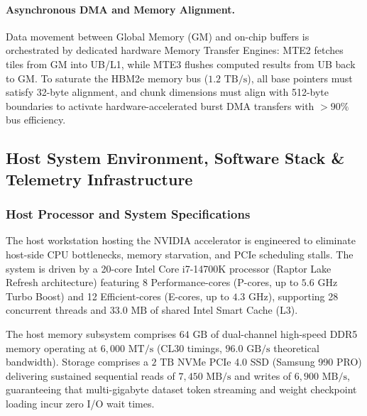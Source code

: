 \paragraph{Asynchronous DMA and Memory Alignment.} Data movement between Global Memory (GM) and on-chip buffers is orchestrated by dedicated hardware Memory Transfer Engines: MTE2 fetches tiles from GM into UB/L1, while MTE3 flushes computed results from UB back to GM. To saturate the HBM2e memory bus ($1.2\text{ TB/s}$), all base pointers must satisfy 32-byte alignment, and chunk dimensions must align with 512-byte boundaries to activate hardware-accelerated burst DMA transfers with $>90\%$ bus efficiency.

\subsection{Host System Environment, Software Stack \& Telemetry Infrastructure}
\label{sec:setup_software_telemetry}

\subsubsection{Host Processor and System Specifications}
The host workstation hosting the NVIDIA accelerator is engineered to eliminate host-side CPU bottlenecks, memory starvation, and PCIe scheduling stalls. The system is driven by a 20-core Intel Core i7-14700K processor (Raptor Lake Refresh architecture) featuring 8 Performance-cores (P-cores, up to $5.6\text{ GHz}$ Turbo Boost) and 12 Efficient-cores (E-cores, up to $4.3\text{ GHz}$), supporting 28 concurrent threads and $33.0\text{ MB}$ of shared Intel Smart Cache (L3). 

The host memory subsystem comprises $64\text{ GB}$ of dual-channel high-speed DDR5 memory operating at $6{,}000\text{ MT/s}$ (CL30 timings, $96.0\text{ GB/s}$ theoretical bandwidth). Storage comprises a $2\text{ TB}$ NVMe PCIe 4.0 SSD (Samsung 990 PRO) delivering sustained sequential reads of $7{,}450\text{ MB/s}$ and writes of $6{,}900\text{ MB/s}$, guaranteeing that multi-gigabyte dataset token streaming and weight checkpoint loading incur zero I/O wait times.


